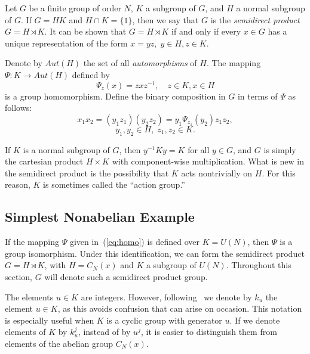 \documentclass[reqno,onecolumn,oneside]{paper}
\newcommand{\<}{\ensuremath{\langle}}
\renewcommand{\>}{\ensuremath{\rangle}}
\newcommand{\sdp}{\ensuremath{\rtimes}}
\begin{document}
Let $G$ be a finite group of order $N$, $K$ a subgroup of $G$,
and $H$ a normal subgroup of $G$. If $G = HK$ and $H \cap
K = \{1\}$, then we say that $G$ is the 
\emph{semidirect product} $G = H \sdp K$. 
It can be shown that $G = H \sdp K$ if and only if every $x \in
G$ has a unique representation of the form $x = yz, \; y\in H,
z\in K$.

Denote by $Aut(H)$ the set of all \emph{automorphisms} of
$H$. The mapping $\Psi:K\rightarrow Aut(H)$ defined by  
\begin{equation}\label{eq:homo}
\Psi_z(x) = zxz^{-1}, \quad z\in K, x\in H
\end{equation}
is a group homomorphism. 
Define the binary composition in $G$
in terms of $\Psi$ as follows:
\begin{equation}\label{eq:PsiProd}
x_1x_2 = (y_1z_1)(y_2z_2)= y_1\Psi_{z_1}(y_2)z_1z_2,
\end{equation}
\[
y_1, y_2 \in H,\; z_1, z_2 \in K. 
\]

If $K$ is a normal subgroup of $G$,
then $y^{-1}Ky = K$ for all $y\in G$, 
and $G$ is simply the cartesian product $H\times K$ 
with component-wise multiplication. 
What is new in the semidirect product is
the possibility that $K$ acts nontrivially on $H$. 
For this reason, $K$ is sometimes called the ``action group.''

\subsection{Simplest Nonabelian Example}
If the mapping $\Psi$ given in~(\ref{eq:homo}) is defined over
$K=U(N)$, then $\Psi$ is a group isomorphism.
Under this identification, we can form the semidirect
product $G = H\sdp K$, with $H = C_N(x)$ and $K$ a
subgroup of $U(N)$.  Throughout this section, $G$ will
denote such a semidirect product group.

The elements $u\in K$ are integers. However, following~\cite{An:2003} we
denote by $k_u$ the element $u\in K$, as this avoids confusion that can arise 
on occasion. This notation is especially useful when $K$ 
is a cyclic group with generator $u$.  If  we denote elements of $K$ by $k_u^j$, instead of 
by $u^j$, it is easier to distinguish them from elements of the abelian group $C_N(x)$.
\end{document}
